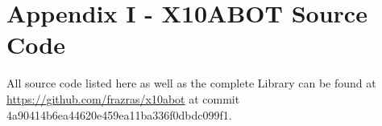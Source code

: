 \chapter*{Appendix I - X10ABOT Source Code}
\label{AppendixI}
All source code listed here as well as the complete \xten Library can be found at \url{https://github.com/frazras/x10abot} at commit 4a90414b6ea44620e459ea11ba336f0dbdc099f1.
    
